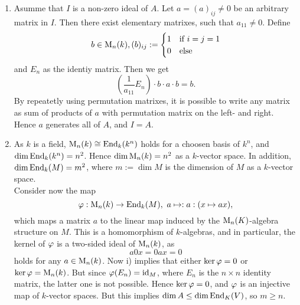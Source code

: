 \begin{sol}
  \begin{enumerate}
    \item Asumme that $I$ is a non-zero ideal of $A$. Let $a=(a)_{ij}\neq 0$ be an arbitrary matrix in $I$. Then there exist elementary matrixes, such that $a_{11}\neq 0$. Define
    \[
    b\in \operatorname{M}_n(k),(b)_{ij}:= \begin{cases} 1&\text{if }i=j=1\\0&\text{else}\\\end{cases}
    \]
    and $E_n$ as the identiy matrix. Then we get
    \[
    \left(\frac{1}{a_{11}} E_n\right)\cdot b \cdot a\cdot b = b.\]
    By repeatetly using permutation matrixes, it is possible to write any matrix as sum of products of $a$ with permutation matrix on the left- and right. Hence $a$ generates all of $A$, and $I=A$.
    \item As $k$ is a field, $\operatorname{M}_n(k)\cong \operatorname{End}_k(k^n)$ holds for a choosen basis of $k^n$, and $\dim \operatorname{End}_k(k^n)=n^2$. Hence $\dim \operatorname{M}_n(k)=n^2$ as a $k$-vector space. In addition, $\dim \operatorname{End}_k(M)=m^2$, where $m:=\dim M$ is the dimension of $M$ as a $k$-vector space.\\
    Consider now the map
    \[
    \varphi:\operatorname{M}_n(k)\to \operatorname{End}_k(M),~a \mapsto: a:(x\mapsto ax),
    \]
    which maps a matrix $a$ to the linear map induced by the $\operatorname{M}_n(K)$-algebra structure on $M$. This is a homomorphism of $k$-algebras, and in particular, the kernel of $\varphi$ is a two-sided ideal of $\operatorname{M}_n(k)$, as
    \[a0x=0ax=0\]
    holds for any $a\in \operatorname{M}_n(k)$.
    Now i) implies that either $\ker \varphi=0$ or $\ker \varphi = \operatorname{M}_n(k)$. But since $\varphi(E_n)=\operatorname{id}_{M}$, where $E_n$ is the $n\times n$ identity matrix, the latter one is not possible. Hence $\ker \varphi =0$, and $\varphi$ is an injective map of $k$-vector spaces. But this implies $\dim A\leq \dim \operatorname{End}_K(V)$, so $m\geq n$.

  \end{enumerate}
\end{sol}
